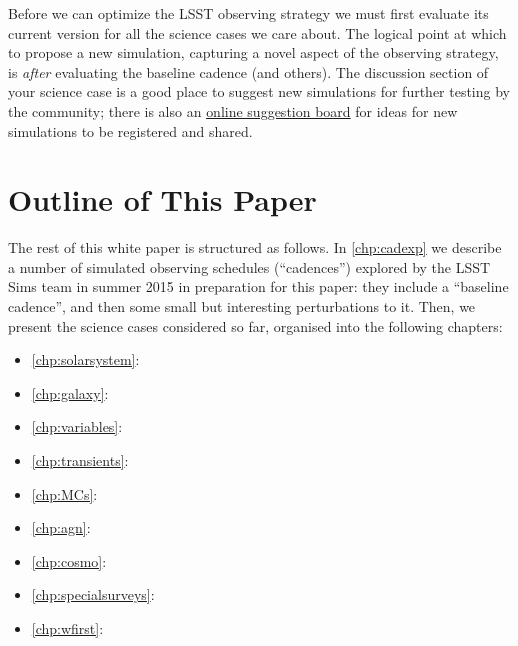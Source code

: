 Before we can optimize the LSST observing strategy we must first
evaluate its current version for all the science cases we care about.
The logical point at which to propose a new \OpSim simulation, capturing
a novel aspect of the observing strategy, is {\it after} evaluating the
baseline  cadence (and others). The discussion section of your science
case is a good place to suggest new \OpSim simulations for further
testing by the community; there is also an
\href{https://github.com/LSSTScienceCollaborations/ObservingStrategy/blob/master/opsim/README.md}{online
suggestion board} for ideas for new  simulations to be registered and
shared.

\navigationbar


\section{Outline of This Paper}
\def\secname{intro:outline}\label{sec:\secname}

The rest of this white paper is structured as follows. In
\autoref{chp:cadexp} we describe a number of \OpSim simulated observing
schedules (``cadences'') explored by the LSST Sims team in summer 2015
in preparation for this paper: they include a ``baseline cadence'', and
then some small but interesting perturbations to it. Then, we present
the science cases considered so far, organised into the following
chapters:

\begin{itemize}
    \item \autoref{chp:solarsystem}: 
    \item \autoref{chp:galaxy}: 
    \item \autoref{chp:variables}: 
    \item \autoref{chp:transients}: 
    \item \autoref{chp:MCs}: 
    \item \autoref{chp:agn}: 
    \item \autoref{chp:cosmo}: 
    \item \autoref{chp:specialsurveys}: 
    \item \autoref{chp:wfirst}: 
\end{itemize}

